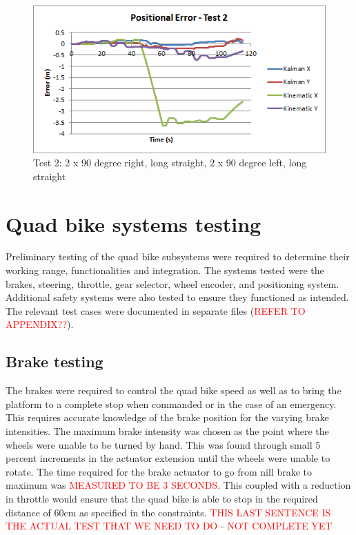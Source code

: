 \documentclass[main.tex]{subfiles}
\begin{document}
\begin{figure}[ht]
\includegraphics[width=\textwidth]{5-Testing/position_error_test_2.png}
\centering
\caption{Test 2: 2 x 90 degree right, long straight, 2 x 90 degree left, long straight} 
\end{figure}

\section{Quad bike systems testing}
Preliminary testing of the quad bike subsystems were required to determine their working range, functionalities and integration. The systems tested were the brakes, steering, throttle, gear selector, wheel encoder, and positioning system. Additional safety systems were also tested to ensure they functioned as intended.
The relevant test cases were documented in separate files (\textcolor{red}{REFER TO APPENDIX??}).

\subsection{Brake testing}
The brakes were required to control the quad bike speed as well as to bring the platform to a complete stop when commanded or in the case of an emergency. This requires accurate knowledge of the brake position for the varying brake intensities. The maximum brake intensity was chosen as the point where the wheels were unable to be turned by hand. This was found through small 5 percent increments in the actuator extension until the wheels were unable to rotate. The time required for the brake actuator to go from nill brake to maximum was \textcolor{red}{MEASURED TO BE 3 SECONDS}. This coupled with a reduction in throttle would ensure that the quad bike is able to stop in the required distance of 60cm as specified in the constraints. \textcolor{red}{THIS LAST SENTENCE IS THE ACTUAL TEST THAT WE NEED TO DO - NOT COMPLETE YET}
\end{document}
